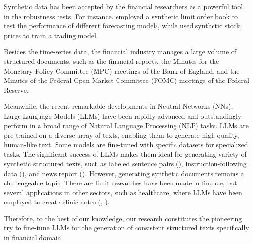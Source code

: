 Synthetic data has been accepted by the financial researchers as a powerful tool in the robustness tests. For instance, \cite{cao2022synthetic} employed a synthetic limit order book to test the performance of different forecasting models, while \cite{carvajal2022synthetic} used synthetic stock prices to train a trading model. 


Besides the time-series data, the financial industry manages a large volume of structured documents, such as the financial reports, the Minutes for the Monetary Policy Committee (MPC) meetings of the Bank of England, and the Minutes of the Federal Open Market Committee (FOMC) meetings of the Federal Reserve. 

Meanwhile, the recent remarkable developments in Neutral Networks (NNs), Large Language Models (LLMs) have been rapidly advanced and outstandingly perform in a broad range of Natural Language Processing (NLP) tasks. LLMs are pre-trained on a diverse array of texts, enabling them to generate high-quality, human-like text. Some models are fine-tuned with specific datasets for specialized tasks. The significant success of LLMs makes them ideal for generating variety of synthetic structured texts, such as labeled sentence pairs (\cite{schick2021generating}),  instruction-following data (\cite{peng2023instruction}), and news report (\cite{yu2024large}). However, generating synthetic documents remains a challengeable topic. There are limit researches have been made in finance, but several applications in other sectors, such as healthcare, where LLMs have been employed to create clinic notes (\cite{li2021synthetic}, \cite{meoni2024generating}). 

Therefore, to the best of our knowledge, our research constitutes the pioneering try to fine-tune LLMs for the generation of  consistent structured texts specifically in financial domain. 





